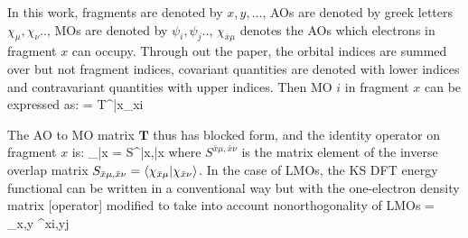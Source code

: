 \documentclass[aps,prl,twocolumn,reprint,amsmath,amssymb]{revtex4-1}
\begin{document}
In this work, fragments are denoted by $x,y,\ldots$, AOs are denoted by greek letters $\chi_\mu,\chi_\nu ..$, MOs are denoted by $\psi_i,\psi_j..$, $\chi_{\bar{x}\mu}$ denotes the AOs which electrons in fragment $x$ can occupy. Through out the paper, the orbital indices are summed over but not fragment indices, covariant quantities are denoted with lower indices and contravariant quantities with upper indices. Then MO $i$ in fragment $x$ can be expressed as:
\bea
{} =  {T^{\bar{x}\mu}}_{xi}
\label{eq:LMO}
\eea

The AO to MO matrix $\mathbf{T}$ thus has blocked form, and the identity operator on fragment $x$ is:
%
\bea
{}_{\bar{x}} =  S^{\bar{x}\mu,\bar{x}\nu} 
\eea
%
where $S^{\bar{x}\mu,\bar{x}\nu}$ is the matrix element of the inverse overlap matrix $S_{\bar{x}\mu,\bar{x}\nu} = \langle  \chi_{\bar{x}\mu} \vert  \chi_{\bar{x}\nu} \rangle $. In the case of LMOs, the KS DFT energy functional can be written in a conventional way but with the one-electron density matrix [operator] modified to take into account nonorthogonality of LMOs
\bea \label{eq:dm}
 = \sum_{x,y}  \sigma^{xi,yj} 
\eea
%
\end{document}
